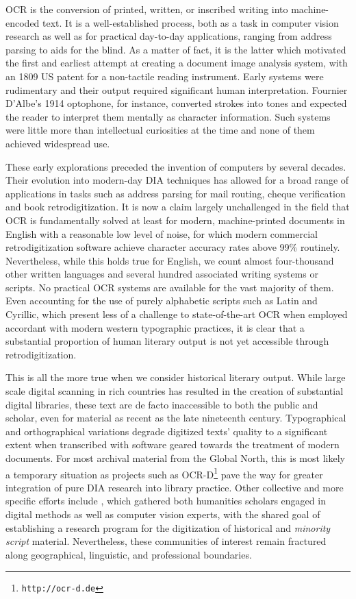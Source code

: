 OCR is the conversion of printed, written, or inscribed writing into
machine-encoded text. It is a well-established process, both as a task in
computer vision research as well as for practical day-to-day applications,
ranging from address parsing to aids for the blind. As a matter of fact, it is
the latter which motivated the first and earliest attempt at creating a
document image analysis system, with an 1809 US patent for a non-tactile
reading instrument. Early systems were rudimentary and their output required
significant human interpretation. Fournier D’Albe’s 1914 optophone, for
instance, converted strokes into tones and expected the reader to interpret
them mentally as character information. Such systems were little more than
intellectual curiosities at the time and none of them achieved widespread use.

These early explorations preceded the invention of computers by several
de\-cades. Their evolution into modern-day DIA techniques has allowed for a broad
range of applications in tasks such as address parsing for mail routing, cheque
verification and book retrodigitization. It is now a claim largely unchallenged
in the field that OCR is fundamentally solved at least for modern,
machine-printed documents in English with a reasonable low level of noise, for
which modern commercial retrodigitization software achieve character accuracy
rates above 99\% routinely. Nevertheless, while this holds true for English, we
count almost four-thousand other written languages and several hundred associated
writing systems or scripts. No practical OCR systems are available for the vast
majority of them. Even accounting for the use of purely alphabetic scripts such
as Latin and Cyrillic, which present less of a challenge to state-of-the-art
OCR when employed accordant with modern western typographic practices, it is
clear that a substantial proportion of human literary output is not yet
accessible through retrodigitization.

This is all the more true when we consider historical literary output. While
large scale digital scanning in rich countries has resulted in the creation of
substantial digital libraries, these text are de facto inaccessible to both the
public and scholar, even for material as recent as the late nineteenth century.
Typographical and orthographical variations degrade digitized texts' quality to
a significant extent when transcribed with software geared towards the
treatment of modern documents. For most archival material from the Global
North, this is most likely a temporary situation as projects such as
OCR-D\footnote{\texttt{http://ocr-d.de}} pave the way for greater integration
of pure DIA research into library practice. Other collective and more specific
efforts include \cite{smith2018research}, which gathered both humanities
scholars engaged in digital methods as well as computer vision experts, with
the shared goal of establishing a research program for the digitization of
historical and \emph{minority script} material. Nevertheless, these communities
of interest remain fractured along geographical, linguistic, and professional
boundaries.

